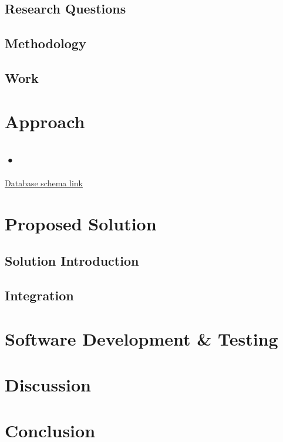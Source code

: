 \documentclass{cslthse-msc}
\begin{document}
\section{Research Questions}
\section{Methodology}
\section{Work}

\chapter{Approach}
\section{•}
\href{https://drive.google.com/file/d/0B1IYTmE2hnD-eGQ0N2tvYXZNNVE/view?usp=sharing}{Database schema link}

\chapter{Proposed Solution}
\section{Solution Introduction}
\section{Integration}

\chapter{Software Development \& Testing}

\chapter{Discussion}

\chapter{Conclusion}
\end{document}
